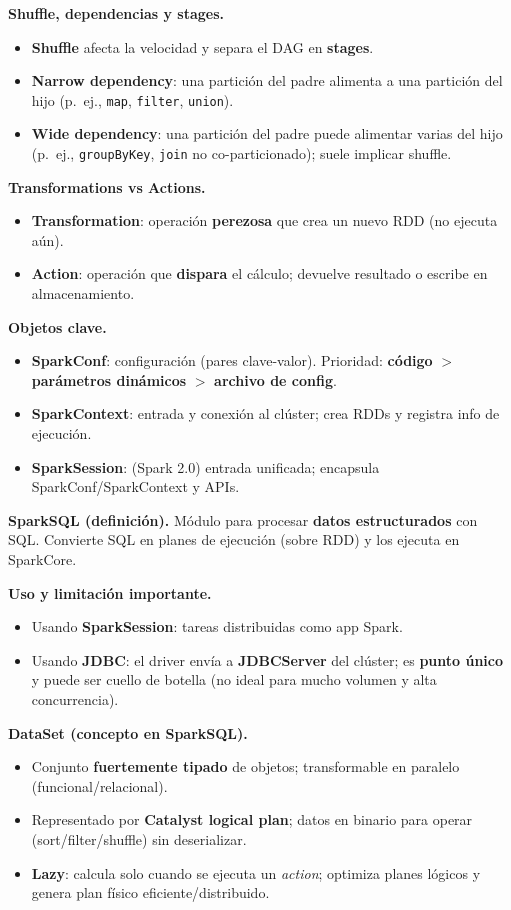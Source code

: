 \documentclass[8pt,a4paper,twocolumn]{article}
\begin{document}
\textbf{Shuffle, dependencias y stages.}
\begin{itemize}
\item \textbf{Shuffle} afecta la velocidad y separa el DAG en \textbf{stages}.
\item \textbf{Narrow dependency}: una partición del padre alimenta a una partición del hijo (p.\ ej., \texttt{map}, \texttt{filter}, \texttt{union}).
\item \textbf{Wide dependency}: una partición del padre puede alimentar varias del hijo (p.\ ej., \texttt{groupByKey}, \texttt{join} no co-particionado); suele implicar shuffle.
\end{itemize}

\textbf{Transformations vs Actions.}
\begin{itemize}
\item \textbf{Transformation}: operación \textbf{perezosa} que crea un nuevo RDD (no ejecuta aún).
\item \textbf{Action}: operación que \textbf{dispara} el cálculo; devuelve resultado o escribe en almacenamiento.
\end{itemize}

\textbf{Objetos clave.}
\begin{itemize}
\item \textbf{SparkConf}: configuración (pares clave-valor). Prioridad: \textbf{código} $>$ \textbf{parámetros dinámicos} $>$ \textbf{archivo de config}.
\item \textbf{SparkContext}: entrada y conexión al clúster; crea RDDs y registra info de ejecución.
\item \textbf{SparkSession}: (Spark 2.0) entrada unificada; encapsula SparkConf/SparkContext y APIs.
\end{itemize}

\textbf{SparkSQL (definición).} Módulo para procesar \textbf{datos estructurados} con SQL. Convierte SQL en planes de ejecución (sobre RDD) y los ejecuta en SparkCore.

\textbf{Uso y limitación importante.}
\begin{itemize}
\item Usando \textbf{SparkSession}: tareas distribuidas como app Spark.
\item Usando \textbf{JDBC}: el driver envía a \textbf{JDBCServer} del clúster; es \textbf{punto único} y puede ser cuello de botella (no ideal para mucho volumen y alta concurrencia).
\end{itemize}

\textbf{DataSet (concepto en SparkSQL).}
\begin{itemize}
\item Conjunto \textbf{fuertemente tipado} de objetos; transformable en paralelo (funcional/relacional).
\item Representado por \textbf{Catalyst logical plan}; datos en binario para operar (sort/filter/shuffle) sin deserializar.
\item \textbf{Lazy}: calcula solo cuando se ejecuta un \textit{action}; optimiza planes lógicos y genera plan físico eficiente/distribuido.
\end{itemize}
\end{document}
